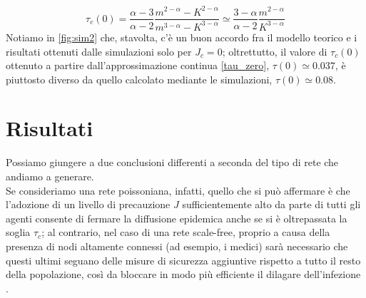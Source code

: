 \begin{equation}
	\tau_c\left(0\right) = \frac{\alpha - 3}{\alpha - 2} \frac{m^{2 - \alpha} - K^{2 - \alpha}}{m^{3 - \alpha} - K^{3 - \alpha}} \simeq \frac{3 - \alpha}{\alpha - 2} \frac{m^{2 - \alpha}}{K^{3 - \alpha}}
	\label{tau_zero}
\end{equation}
Notiamo in \cref{fig:sim2} che, stavolta, c'è un buon accordo fra il modello teorico e i risultati ottenuti dalle simulazioni solo per $ J_c = 0 $; oltrettutto, il valore di $ \tau_c\left(0\right) $ ottenuto a partire dall'approssimazione continua \eqref{tau_zero}, $ \tau\left(0\right) \simeq 0.037 $, è piuttosto diverso da quello calcolato mediante le simulazioni, $ \tau\left(0\right) \simeq 0.08 $. 
\section{Risultati}
Possiamo giungere a due conclusioni differenti a seconda del tipo di rete che andiamo a generare. \\Se consideriamo una rete poissoniana, infatti, quello che si può affermare è che l'adozione di un livello di precauzione $ J $ sufficientemente alto da parte di tutti gli agenti consente di fermare la diffusione epidemica anche se si è oltrepassata la soglia $ \tau_c $; al contrario, nel caso di una rete scale-free, proprio a causa della presenza di nodi altamente connessi (ad esempio, i medici) sarà necessario che questi ultimi seguano delle misure di sicurezza aggiuntive rispetto a tutto il resto della popolazione, così da bloccare in modo più efficiente il dilagare dell'infezione \cite{Bagnoli2007}.